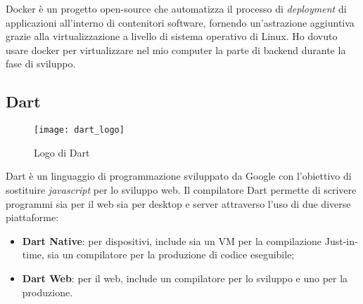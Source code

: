 Docker è un progetto open-source che automatizza il processo di \textit{deployment} di applicazioni all'interno di contenitori software, fornendo un'astrazione aggiuntiva grazie alla virtualizzazione a livello di sistema operativo di Linux. 
Ho dovuto usare docker per virtualizzare nel mio computer la parte di backend durante la fase di sviluppo.

\subsection{Dart}
\begin{figure}[ht]
    \centering
    \texttt{[image: dart\_logo]}
    \caption{Logo di Dart}
\end{figure}
Dart è un linguaggio di programmazione sviluppato da Google con l'obiettivo di sostituire \textit{javascript} per lo sviluppo web.
Il compilatore Dart permette di scrivere programmi sia per il web sia per desktop e server attraverso l'uso di due diverse piattaforme:
\begin{itemize}
    \item \textbf{Dart Native}: per dispositivi, include sia un VM per la compilazione Just-in-time, sia un compilatore per la produzione di codice eseguibile;
    \item \textbf{Dart Web}: per il web, include un compilatore per lo sviluppo e uno per la produzione.
\end{itemize}

